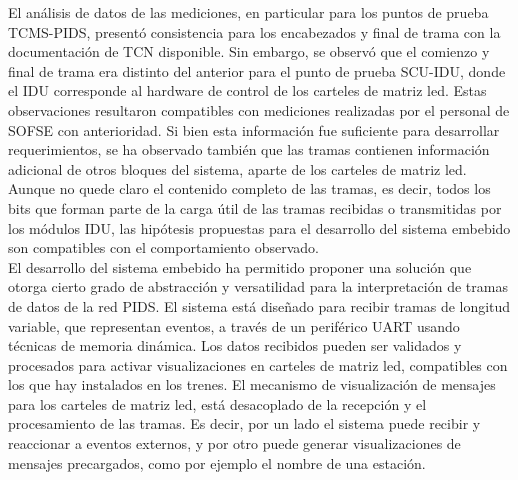 El análisis de datos de las mediciones, en particular para los puntos de prueba TCMS-PIDS, presentó consistencia para los encabezados y final de trama con la documentación de TCN disponible. Sin embargo, se observó que el comienzo y final de trama era distinto del anterior para el punto de prueba SCU-IDU, donde el IDU corresponde al hardware de control de los carteles de matriz led. Estas observaciones resultaron compatibles con mediciones realizadas por el personal de SOFSE con anterioridad. Si bien esta información fue suficiente para desarrollar requerimientos, se ha observado también que las tramas contienen información adicional de otros bloques del sistema, aparte de los carteles de matriz led. Aunque no quede claro el contenido completo de las tramas, es decir, todos los bits que forman parte de la carga útil de las tramas recibidas o transmitidas por los módulos IDU, las hipótesis propuestas para el desarrollo del sistema embebido son compatibles con el comportamiento observado.\\


El desarrollo del sistema embebido ha permitido proponer una solución que otorga cierto grado de abstracción y versatilidad para la interpretación de tramas de datos de la red PIDS. El sistema está diseñado para recibir tramas de longitud variable, que representan eventos, a través de un periférico UART usando técnicas de memoria dinámica. Los datos recibidos pueden ser validados y procesados para activar visualizaciones en carteles de matriz led, compatibles con los que hay instalados en los trenes. El mecanismo de visualización de mensajes para los carteles de matriz led, está desacoplado de la recepción y el procesamiento de las tramas. Es decir, por un lado el sistema puede recibir y reaccionar a eventos externos, y por otro puede generar visualizaciones de mensajes precargados, como por ejemplo el nombre de una estación.\\

